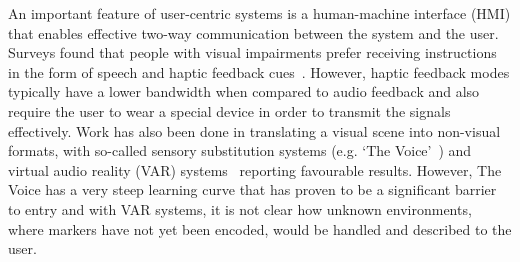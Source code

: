 \documentclass[sigconf, screen=true, anonymous=true]{acmart}
\begin{document}
An important feature of user-centric systems is a human-machine interface (HMI) that enables effective two-way communication between the system and the user.
Surveys found that people with visual impairments prefer receiving instructions in the form of speech and haptic feedback cues~\cite{khoo2016multimodal, ross2000wearable, vazquez2012helping}.
However, haptic feedback modes typically have a lower bandwidth when compared to audio feedback and also require the user to wear a special device in order to transmit the signals effectively.
Work has also been done in translating a visual scene into non-visual formats, with so-called sensory substitution systems (e.g. `The Voice'~\cite{meijer2010}) and virtual audio reality (VAR) systems~\cite{frauenberger2003} reporting favourable results.
However, The Voice has a very steep learning curve that has proven to be a significant barrier to entry and with VAR systems, it is not clear how unknown environments, where markers have not yet been encoded, would be handled and described to the user. 
\end{document}
